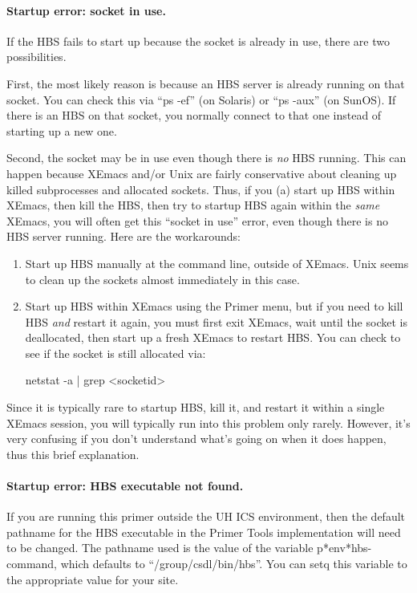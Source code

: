 \paragraph{Startup error: socket in use.}  If the HBS fails to start up
because the socket is already in use, there are two possibilities.  

First, the most likely reason is because an HBS server is already running
on that socket.  You can check this via ``ps -ef'' (on Solaris) or ``ps
-aux'' (on SunOS).  If there is an HBS on that socket, you normally connect
to that one instead of starting up a new one.

Second, the socket may be in use even though there is {\em no} HBS running.
This can happen because XEmacs and/or Unix are fairly conservative about
cleaning up killed subprocesses and allocated sockets.  Thus, if you (a)
start up HBS within XEmacs, then kill the HBS, then try to startup HBS
again within the {\em same} XEmacs, you will often get this ``socket in
use'' error, even though there is no HBS server running.  Here are the
workarounds: 

\begin{enumerate}

\item Start up HBS manually at the command line, outside of XEmacs.  Unix
  seems to clean up the sockets almost immediately in this case.

\item Start up HBS within XEmacs using the Primer menu, but if you need to
  kill HBS {\em and} restart it again, you must first exit XEmacs, wait until
  the socket is deallocated, then start up a fresh XEmacs to restart HBS.  You
  can check to see if the socket is still allocated via:
  \begin{code}
    netstat -a | grep <socketid>
  \end{code}
\end{enumerate} 

Since it is typically rare to startup HBS, kill it, and restart it within a
single XEmacs session, you will typically run into this problem only
rarely. However, it's very confusing if you don't understand what's going
on when it does happen, thus this brief explanation.

\paragraph{Startup error: HBS executable not found.}  If you are running
this primer outside the UH ICS environment, then the default pathname for
the HBS executable in the Primer Tools implementation will need to be
changed.  The pathname used is the value of the variable 
p*env*hbs-command, which defaults to ``/group/csdl/bin/hbs''.  You can 
setq this variable to the appropriate value for your site. 

